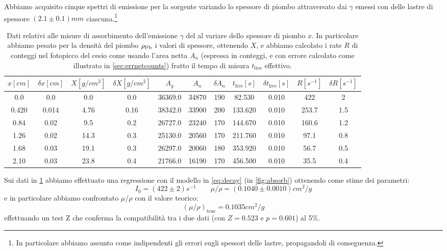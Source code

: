 Abbiamo acquisito cinque spettri di emissione per la sorgente  variando lo spessore di piombo attraversato dai $ \gamma $ emessi con delle lastre di spessore $(2.1 \pm 0.1) \unit{mm} $ ciascuna.\footnote{In particolare abbiamo assunto come indipendenti gli errori sugli spessori delle lastre, propagandoli di conseguenza.}

\begin{table}
\centering \footnotesize
\begin{tabular}{cccc|ccc|cc|cc} 
$x [\unit{cm}]$ & $\delta x [\unit{cm}]$ & $X [\unit{g/cm^2}]$ & $\delta X [\unit{g/cm^2}]$ & $A_g$ & $A_n$ & $\delta A_n$ & $ t_\text{live} [\unit{s}]$ & $\delta t_\text{live} [\unit{s}]$ & $R [\unit{s^{-1}}]$ & $\delta R [\unit{s^{-1}}]$ \\
\hline
0.0 & 0.0 & 0.0 & 0.0 & 36369.0 & 34870 & 190 & 82.530 & 0.010 & 422 & 2\\
0.420 & 0.014 & 4.76 & 0.16 & 38342.0 & 33900 & 200 & 133.620 & 0.010 & 253.7 & 1.5\\
0.84 & 0.02 & 9.5 & 0.2 & 26727.0 & 23240 & 170 & 144.670 & 0.010 & 160.6 & 1.2\\
1.26 & 0.02 & 14.3 & 0.3 & 25130.0 & 20560 & 170 & 211.760 & 0.010 & 97.1 & 0.8\\
1.68 & 0.03 & 19.1 & 0.3 & 26297.0 & 20060 & 180 & 353.920 & 0.010 & 56.7 & 0.5\\
2.10 & 0.03 & 23.8 & 0.4 & 21766.0 & 16190 & 170 & 456.500 & 0.010 & 35.5 & 0.4
\end{tabular}
\caption{Dati relativi alle misure di assorbimento dell'emissione $ \gamma $ del  al variare dello spessore di piombo $ x $. In particolare abbiamo pesato per la densità del piombo $ \rho_{\ce{Pb}} $ i valori di spessore, ottenendo $ X $, e abbiamo calcolato i rate $ R $ di conteggi nel fotopicco del cesio come usando l'area netta $ A_n $ (espressa in conteggi, e con errore calcolato come illustrato in \cref{sec:errnetcounts}) fratto il tempo di misura $ t_\text{live} $ effettivo.}
\label{tab:csassorbim}
\end{table}

Sui dati in \cref{tab:csassorbim} abbiamo effettuato una regressione con il modello in \cref{eq:decay} (in \cref{fig:absorb}) ottenendo come stime dei parametri:
\begin{equation}
	I_0 = (422 \pm 2) \unit{s^{-1}} \qquad \mu / \rho = (0.1040 \pm 0.0010) \unit{cm^2/g}
\end{equation}
e in particolare abbiamo confrontato $ \mu / \rho $ con il valore teorico:
\begin{equation}
	(\mu / \rho)_\text{true} = 0.1035 \unit{cm^2/g}
\end{equation}
effettuando un test Z che conferma la compatibilità tra i due dati (con $Z = 0.523 $ e $ p = 0.601 $) al 5\%. 

